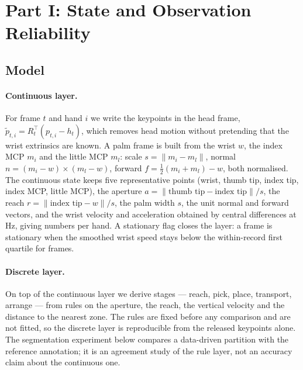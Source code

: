 \documentclass{swmcmthesis}
\begin{document}
\section{Part I: State and Observation Reliability}
\label{sec:partone}

\subsection{Model}
\label{sec:p1model}

\paragraph{Continuous layer.} For frame $t$ and hand $i$ we write the keypoints in
the head frame, $\tilde p_{t,i}=R_t^{\top}(p_{t,i}-h_t)$, which removes head motion
without pretending that the wrist extrinsics are known. A palm frame is built from
the wrist $w$, the index MCP $m_i$ and the little MCP $m_l$: scale
$s=\lVert m_i-m_l\rVert$, normal $n=(m_i-w)\times(m_l-w)$, forward
$f=\tfrac12(m_i+m_l)-w$, both normalised. The continuous state keeps five
representative points (wrist, thumb tip, index tip, index MCP, little MCP), the
aperture $a=\lVert \text{thumb tip}-\text{index tip}\rVert/s$, the reach
$r=\lVert \text{index tip}-w\rVert/s$, the palm width $s$, the unit normal and
forward vectors, and the wrist velocity and acceleration obtained by central
differences at \slotFPS{} Hz, giving \slotDataStateDim{} numbers per hand. A
stationary flag closes the layer: a frame is stationary when the smoothed wrist
speed stays below the within-record first quartile for \slotSmoothWin{} frames.

\paragraph{Discrete layer.} On top of the continuous layer we derive
\slotNStages{} stages --- reach, pick, place, transport, arrange --- from rules on
the aperture, the reach, the vertical velocity and the distance to the nearest
zone. The rules are fixed before any comparison and are not fitted, so the
discrete layer is reproducible from the released keypoints alone. The
segmentation experiment below compares a data-driven partition with the reference
annotation; it is an agreement study of the rule layer, not an accuracy claim
about the continuous one.
\end{document}
